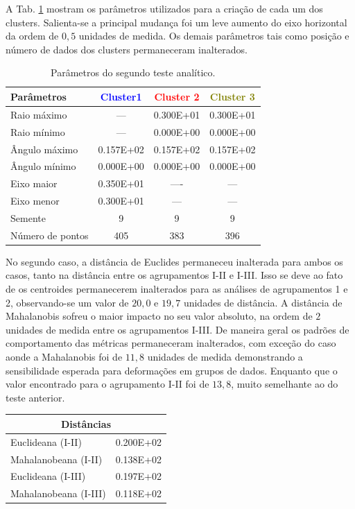 A Tab. \ref{analise2} mostram os parâmetros utilizados para a criação de cada um dos clusters. Salienta-se a principal mudança foi um leve aumento do eixo horizontal da ordem de $0,5$ unidades de medida. Os demais parâmetros tais como posição e número de dados dos clusters permaneceram inalterados. 

\begin{table}[H]
	\centering
	\caption{Parâmetros do segundo teste analítico.}
	\label{analise2}
	\begin{tabular}{lccc}
		\hline
		Parâmetros       & \textcolor{blue}{Cluster1} & \textcolor{red}{Cluster 2} & \textcolor{olive}{Cluster 3} \\ \hline
		Raio máximo      & --- & 0.300E+01 & 0.300E+01 \\
		Raio mínimo      & --- & 0.000E+00 & 0.000E+00 \\
		Ângulo máximo    & 0.157E+02 & 0.157E+02 & 0.157E+02 \\
		Ângulo mínimo    & 0.000E+00 & 0.000E+00 & 0.000E+00 \\
		Eixo maior        & 0.350E+01        & ----         & ---         \\
		Eixo menor          & 0.300E+01        & ---       & ---        \\
		Semente          & 9         & 9         & 9         \\
		Número de pontos & 405       & 383       & 396   \\   \hline
	\end{tabular}
\end{table}

No segundo caso, a distância de Euclides permaneceu inalterada para ambos os casos, tanto na distância entre os agrupamentos I-II e I-III. Isso se deve ao fato de os centroides permanecerem inalterados para as análises de agrupamentos 1 e 2, observando-se um valor de $20,0$ e $19,7$ unidades de distância. 
A distância de Mahalanobis sofreu o maior impacto no seu valor absoluto, na ordem de $2$ unidades de medida entre os agrupamentos I-III. De maneira geral os padrões de comportamento das métricas permaneceram inalterados, com exceção do caso aonde a Mahalanobis foi de $11,8$ unidades de medida demonstrando a sensibilidade esperada para deformações em grupos de dados. Enquanto que o valor encontrado para o agrupamento I-II foi de $13,8$, muito semelhante ao do teste anterior. 

 \begin{table}[H]
 	\centering
 	\label{metrica2}
 	\begin{tabular}{|l|l|}
 		\hline
 		\multicolumn{2}{|c|}{Distâncias}  \\ \hline
 		Euclideana (I-II)     & 0.200E+02 \\ \hline
 		Mahalanobeana (I-II)  & 0.138E+02 \\ \hline
 		Euclideana (I-III)    & 0.197E+02 \\ \hline
 		Mahalanobeana (I-III) &  0.118E+02 \\ \hline
 	\end{tabular}
 \end{table}


